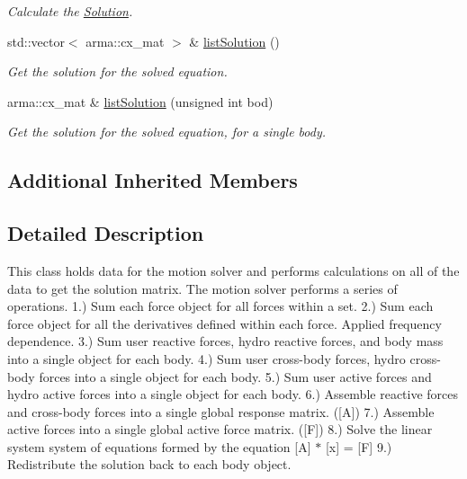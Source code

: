 \begin{DoxyCompactItemize}
\begin{DoxyCompactList}\small\item\em Calculate the \hyperlink{classosea_1_1ofreq_1_1_solution}{Solution}. \end{DoxyCompactList}\item 
std\-::vector$<$ arma\-::cx\-\_\-mat $>$ \& \hyperlink{classosea_1_1ofreq_1_1_motion_solver_a8391c0f67d1d711294f2e6f44363b9bf}{list\-Solution} ()
\begin{DoxyCompactList}\small\item\em Get the solution for the solved equation. \end{DoxyCompactList}\item 
arma\-::cx\-\_\-mat \& \hyperlink{classosea_1_1ofreq_1_1_motion_solver_a20a5c24bd163adb5654eceee6030f898}{list\-Solution} (unsigned int bod)
\begin{DoxyCompactList}\small\item\em Get the solution for the solved equation, for a single body. \end{DoxyCompactList}\end{DoxyCompactItemize}
\subsection*{Additional Inherited Members}


\subsection{Detailed Description}
This class holds data for the motion solver and performs calculations on all of the data to get the solution matrix. The motion solver performs a series of operations. 1.) Sum each force object for all forces within a set. 2.) Sum each force object for all the derivatives defined within each force. Applied frequency dependence. 3.) Sum user reactive forces, hydro reactive forces, and body mass into a single object for each body. 4.) Sum user cross-\/body forces, hydro cross-\/body forces into a single object for each body. 5.) Sum user active forces and hydro active forces into a single object for each body. 6.) Assemble reactive forces and cross-\/body forces into a single global response matrix. (\mbox{[}A\mbox{]}) 7.) Assemble active forces into a single global active force matrix. (\mbox{[}F\mbox{]}) 8.) Solve the linear system system of equations formed by the equation \mbox{[}A\mbox{]} $\ast$ \mbox{[}x\mbox{]} = \mbox{[}F\mbox{]} 9.) Redistribute the solution back to each body object. 

